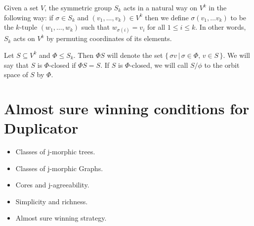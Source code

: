 \documentclass[oneside, 11pt, letterpaper]{report}
\begin{document}
Given a set $V$, the symmetric group $S_k$ acts in a natural way on $V^k$ in the following way:
if $\sigma \in S_k$ and $(v_1,\dots , v_k) \in V^k$ then we define $\sigma (v_1,\dots v_k)$ to be
the $k$-tuple $(w_1, \dots , w_k)$ such that $w_{\sigma(i)}=v_i$ for all $1\leq i \leq k$. 
In other words, $S_k$ acts on $V^k$ by permuting coordinates of its elements. \par
Let $S \subseteq V^k$ and $\Phi \leq S_k$. Then $\Phi S$ will denote the set 
$\{ \, \sigma v \, | \, \sigma \in \Phi, \, v\in S \, \}$. We will say that $S$ is $\Phi$-closed
if $\Phi S = S$. If $S$ is $\Phi$-closed, we will call $S/ \phi$ to the orbit space of 
$S$ by $\Phi$.




\chapter{Almost sure winning conditions for Duplicator}

\begin{itemize}
	\item Classes of j-morphic trees.
	\item Classes of j-morphic Graphs.
	\item Cores and j-agreeability.
	\item Simplicity and richness.
	\item Almost sure winning strategy.
	
\end{itemize}
\end{document}
